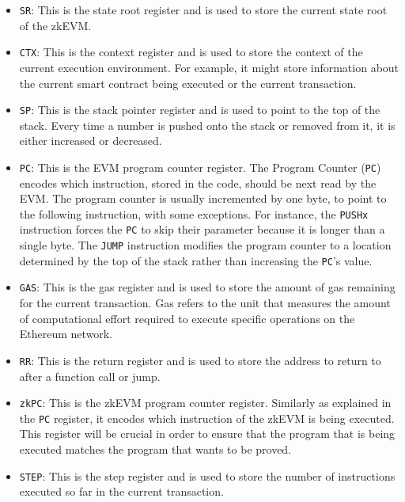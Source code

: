 \begin{itemize}
    
    \item \texttt{SR}: This is the state root register and is used to store the current state root of the zkEVM.
    
    \item \texttt{CTX}: This is the context register and is used to store the context of the current execution environment. For example, it might store information about the current smart contract being executed or the current transaction.
    
    \item \texttt{SP}: This is the stack pointer register and is used to point to the top of the stack. Every time a number is pushed onto the stack or removed from it, it is either increased or decreased. 
    
    \item \texttt{PC}: This is the EVM program counter register. The Program Counter (\texttt{PC}) encodes which instruction, stored in the code, should be next read by the EVM.  The program counter is usually incremented by one byte, to point to the following instruction, with some exceptions. For instance, the \texttt{PUSHx} instruction forces the \texttt{PC} to skip their parameter because it is longer than a single byte. The \texttt{JUMP} instruction modifies the program counter to a location determined by the top of the stack rather than increasing the \texttt{PC}'s value. 
    
    \item \texttt{GAS}: This is the gas register and is used to store the amount of gas remaining for the current transaction. Gas refers to the unit that measures the amount of computational effort required to execute specific operations on the Ethereum network.
    
    \item \texttt{RR}: This is the return register and is used to store the address to return to after a function call or jump.
    
    \item \texttt{zkPC}: This is the zkEVM program counter register. Similarly as explained in the \texttt{PC} register, it encodes which instruction of the zkEVM is being executed. This register will be crucial in order to ensure that the program that is being executed matches the program that wants to be proved. 
    
    \item \texttt{STEP}: This is the step register and is used to store the number of instructions executed so far in the current transaction.
    

\end{itemize}
